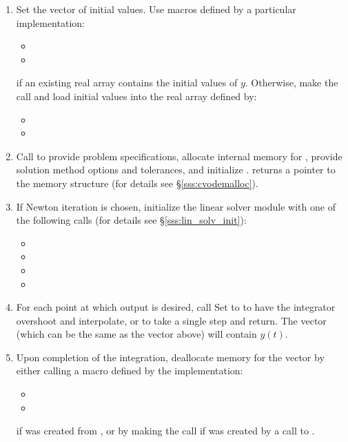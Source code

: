 \begin{enumerate}
\item Set the vector  of initial values.  Use macros
  defined by a particular {\nvector} implementation:
  \begin{itemize}
  \item {\s} 
  \item {\p} 
  \end{itemize}
  if an existing real array  contains the initial values of $y$.  
  Otherwise, make the call  and load 
  initial values into the real array defined by:
  \begin{itemize}
  \item {\s}
  \item {\p}
  \end{itemize}
  
\item\label{i:cvode_malloc} 
  Call  
  to provide problem specifications,
  allocate internal memory for {\cvode}, 
  provide solution method options and tolerances, and initialize {\cvode}. 
   returns a pointer to the {\cvode} memory structure 
  (for details see \S\ref{sss:cvodemalloc}).
  
\item\label{i:lin_solver} If Newton iteration is chosen, initialize the linear solver module
  with one of the following calls (for details see \S\ref{sss:lin_solv_init}):
  \begin{itemize}
  \item {\s} 
  \item {\s} 
  \item {}
  \item {}
  \end{itemize}
  
\item 
  For each point at which output is desired, call
  Set  to  to have the integrator overshoot 
   and interpolate, or  to take a single 
  step and return. The vector  (which can be the same as
  the vector  above) will contain $y(t)$.
  
\item Upon completion of the integration, deallocate memory for the vector 
  by either calling a macro defined by the {\nvector} implementation:
  \begin{itemize}
  \item {\s} 
  \item {\p}
  \end{itemize}
  if  was created from , or by making the call 
   if  was created by a call to .
  

\end{enumerate}
